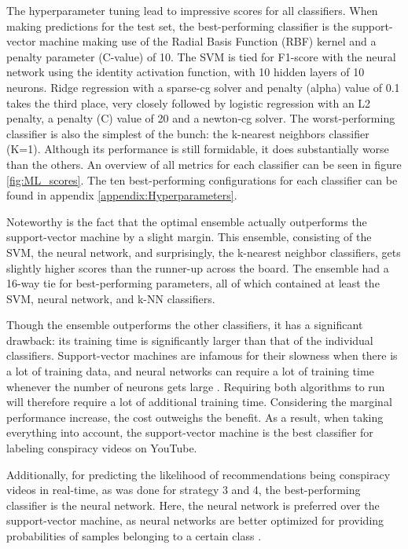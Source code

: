\documentclass[../main.tex]{subfiles}
\begin{document}
The hyperparameter tuning lead to impressive scores for all classifiers. When making predictions for the
test set, the best-performing classifier is the support-vector machine making use of the Radial Basis
Function (RBF) kernel and a penalty parameter (C-value) of 10. The SVM is tied for F1-score with the neural 
network using the identity activation function, with 10 hidden layers of 10 neurons. Ridge regression with a 
sparse-cg solver and penalty (alpha) value of 0.1 takes the third place, very closely followed by logistic 
regression with an L2 penalty, a penalty (C) value of 20 and a newton-cg solver. The worst-performing 
classifier is also the simplest of the bunch: the k-nearest neighbors classifier (K=1). Although its 
performance is still formidable, it does substantially worse than the others. An overview of all metrics for 
each classifier can be seen in figure \ref{fig:ML_scores}. The ten best-performing configurations for each
classifier can be found in appendix \ref{appendix:Hyperparameters}.

Noteworthy is the fact that the optimal ensemble actually outperforms the support-vector machine by a
slight margin. This ensemble, consisting of the SVM, the neural network, and surprisingly, the k-nearest
neighbor classifiers, gets slightly higher scores than the runner-up across the board. The ensemble had
a 16-way tie for best-performing parameters, all of which contained at least the SVM, neural network,
and k-NN classifiers. 

Though the ensemble outperforms the other classifiers, it has a significant drawback: its training time
is significantly larger than that of the individual classifiers. Support-vector machines are infamous
for their slowness when there is a lot of training data, and neural networks can require a lot of
training time whenever the number of neurons gets large \citep{burges1997improving,
kamarthi1999accelerating}. Requiring both algorithms to run will therefore require a lot of additional
training time. Considering the marginal performance increase, the cost outweighs the benefit. As a
result, when taking everything into account, the support-vector machine is the best classifier for
labeling conspiracy videos on YouTube.

Additionally, for predicting the likelihood of recommendations being conspiracy videos in real-time, as was 
done for strategy 3 and 4, the best-performing classifier is the neural network. Here, the neural network is
preferred over the support-vector machine, as neural networks are better optimized for providing 
probabilities of samples belonging to a certain class \citep{specht1990probabilistic}.
\end{document}
